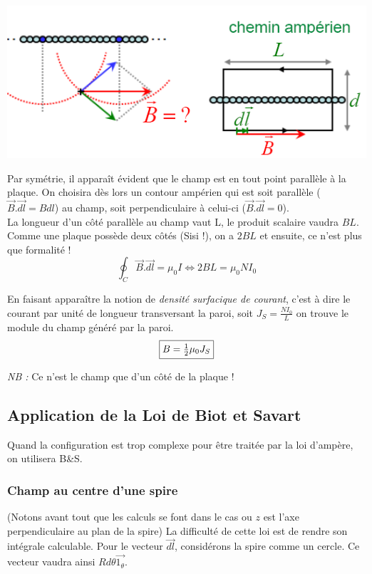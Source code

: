 \documentclass	[11pt, a4paper, openany]{book}
\begin{document}
\begin{center}
\includegraphics[scale=0.55]{magneto/image7.png}
\end{center}


Par symétrie, il apparaît évident que le champ est en tout point parallèle à la plaque. On choisira dès lors un contour ampérien qui est soit parallèle ($\vec{B}.\vec{dl} = Bdl$) au champ, soit perpendiculaire à celui-ci ($\vec{B}.\vec{dl} = 0$). \\
La longueur d'un côté parallèle au champ vaut L, le produit scalaire vaudra $BL$. Comme une plaque possède deux côtés (Sisi !), on a $2BL$ et ensuite, ce n'est plus que formalité ! 
\begin{equation}
\oint_C \vec{B}.\vec{dl} = \mu_0I \Leftrightarrow 2BL = \mu_0N I_0
\end{equation}

En faisant apparaître la notion de \textit{densité surfacique de courant}, c'est à dire le courant par unité de longueur transversant la paroi, soit $J_S = \frac{NI_0}{L}$ on trouve le module du champ généré par la paroi.
\begin{equation}
\fbox{$B = \frac{1}{2}\mu_0J_S$}
\end{equation}

\textit{NB :} Ce n'est le champ que d'un côté de la plaque !

\subsection{Application de la Loi de Biot et Savart}
Quand la configuration est trop complexe pour être traitée par la loi d'ampère, on utilisera B\&S.

\subsubsection{Champ au centre d'une spire}
(Notons avant tout que les calculs se font dans le cas ou $z$ est l'axe perpendiculaire au plan de la spire)
La difficulté de cette loi est de rendre son intégrale calculable. Pour le vecteur $\vec{dl}$, considérons la spire comme  un cercle. Ce vecteur vaudra ainsi $Rd\theta\vec{1_\theta}$. 
\end{document}
